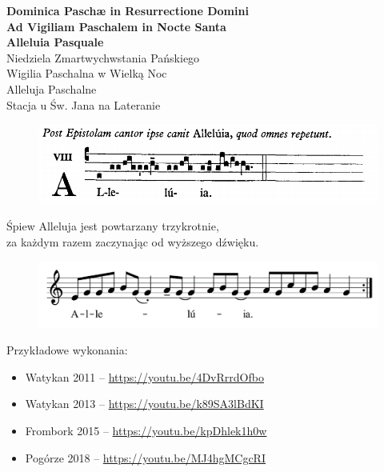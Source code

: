 \documentclass[10pt,oneside,final,notitlepage,a4paper,wide]{mwart}
\begin{document}
%
\begin{center}
	\LARGE{\textbf{Dominica Paschæ in Resurrectione Domini\\Ad Vigiliam Paschalem in Nocte Santa\\Alleluia Pasquale}}\\ \smallskip
	\small{Niedziela Zmartwychwstania Pańskiego\\Wigilia Paschalna w Wielką Noc\\Alleluja Paschalne\\ \smallskip Stacja u Św. Jana na Lateranie}
\vspace{1cm}

	\begin{figure}[h]
		\includegraphics[width=\textwidth]{Alleluia_Choral.png}
	\end{figure}
	\large{Śpiew Alleluja jest powtarzany trzykrotnie,\\za każdym razem zaczynając od wyższego dźwięku.}
	\begin{figure}[h]
		\includegraphics{Alleluia_notes.png}
	\end{figure}
\end{center}
\bigskip

Przykładowe wykonania:
	\begin{itemize}
		\item Watykan 2011 -- \href{https://youtu.be/4DvRrrdOfbo}{https://youtu.be/4DvRrrdOfbo}
		\item Watykan 2013 -- \href{https://youtu.be/k89SA3lBdKI}{https://youtu.be/k89SA3lBdKI}
		\item Frombork 2015 -- \href{https://youtu.be/kpDhlek1h0w}{https://youtu.be/kpDhlek1h0w}
		\item Pogórze 2018 -- \href{https://youtu.be/MJ4hgMCgcRI}{https://youtu.be/MJ4hgMCgcRI}
	\end{itemize}
\end{document}
